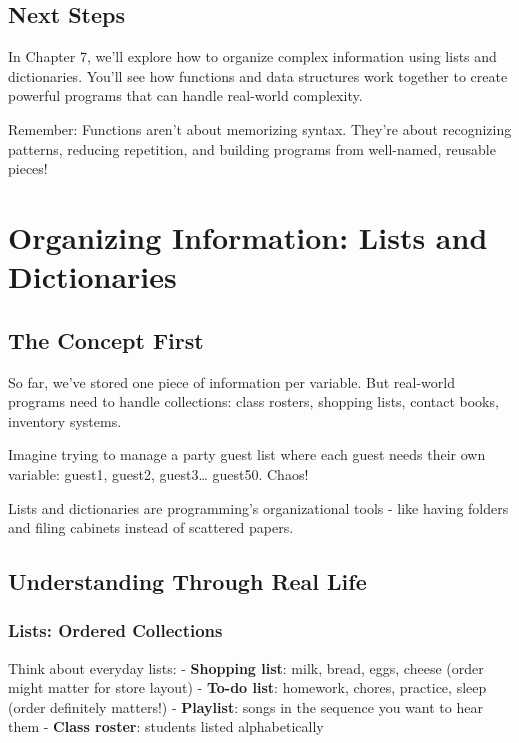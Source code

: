\documentclass[
  letterpaper,
  DIV=11,
  numbers=noendperiod,
  oneside]{scrreprt}
\begin{document}
\section{Next Steps}\label{next-steps-6}

In Chapter 7, we'll explore how to organize complex information using
lists and dictionaries. You'll see how functions and data structures
work together to create powerful programs that can handle real-world
complexity.

Remember: Functions aren't about memorizing syntax. They're about
recognizing patterns, reducing repetition, and building programs from
well-named, reusable pieces!

\chapter{Organizing Information: Lists and
Dictionaries}\label{sec-organizing-information}

\section{The Concept First}\label{the-concept-first-6}

So far, we've stored one piece of information per variable. But
real-world programs need to handle collections: class rosters, shopping
lists, contact books, inventory systems.

Imagine trying to manage a party guest list where each guest needs their
own variable: guest1, guest2, guest3\ldots{} guest50. Chaos!

Lists and dictionaries are programming's organizational tools - like
having folders and filing cabinets instead of scattered papers.

\section{Understanding Through Real
Life}\label{understanding-through-real-life-6}

\subsection{Lists: Ordered Collections}\label{lists-ordered-collections}

Think about everyday lists: - \textbf{Shopping list}: milk, bread, eggs,
cheese (order might matter for store layout) - \textbf{To-do list}:
homework, chores, practice, sleep (order definitely matters!) -
\textbf{Playlist}: songs in the sequence you want to hear them -
\textbf{Class roster}: students listed alphabetically
\end{document}

